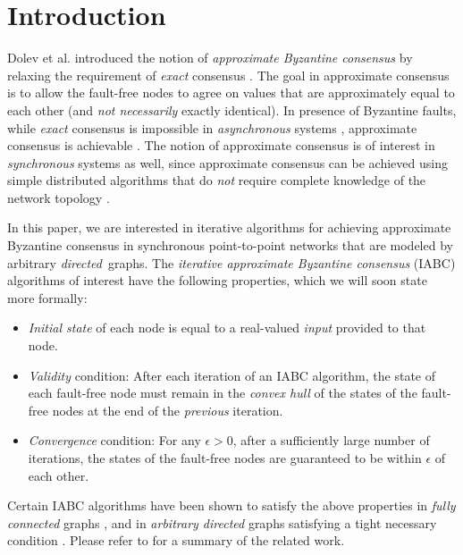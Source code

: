 \documentclass[letterpaper, 12pt]{article}
\begin{document}
 
\section{Introduction}
\label{sec:intro}

Dolev et al. \cite{AA_Dolev_1986} introduced the notion of
{\em approximate Byzantine consensus} by relaxing the requirement
of {\em exact} consensus \cite{AA_nancy}.
The goal in approximate consensus is to allow the fault-free nodes to agree on values that are approximately equal to each other (and {\em not necessarily}
exactly identical). 
In presence of Byzantine faults, while {\em exact} consensus 
is impossible in {\em asynchronous} systems \cite{FLP_one_crash}, approximate
consensus is achievable \cite{AA_Dolev_1986}.
The notion of approximate consensus is of interest in {\em synchronous}
systems as well, since approximate consensus can be achieved using
simple distributed algorithms that do {\em not} require complete knowledge of
the network topology \cite{AA_convergence_markov}.



In this paper, we are interested in iterative algorithms
for achieving approximate Byzantine consensus in synchronous point-to-point
networks that are modeled by arbitrary {\em directed}\, graphs.
The {\em iterative
approximate Byzantine consensus} (IABC) algorithms of interest have
the following properties, which we will soon state more formally:
\begin{itemize}
\item {\em Initial state} of each node is equal to a real-valued
{\em input} provided to that node.
\item {\em Validity} condition: After each iteration of an IABC algorithm, the state of each fault-free node
must remain in the {\em convex hull} of the states of the fault-free nodes
at the end of the {\em previous} iteration.
\item {\em Convergence} condition:
For any $\epsilon>0$, after a sufficiently large number of iterations,
the states of the fault-free nodes are guaranteed to be within $\epsilon$
of each other.
\end{itemize}
Certain IABC algorithms have been shown to satisfy the above properties
in {\em fully
connected} graphs \cite{AA_Dolev_1986,AA_nancy}, and in {\em arbitrary
directed} graphs satisfying a tight necessary condition 
\cite{IBA_sync,us}.
Please refer to \cite{IBA_sync,us} for a summary of the related work.
\end{document}
